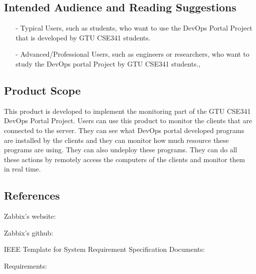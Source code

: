 \documentclass{article}
\newcommand{\MYhref}[3][blue]{\href{#2}{\color{#1}{#3}}}%
\begin{document}
\subsection{ 
	Intended Audience and Reading Suggestions}
\flushleft 
\begin{itemize}
	\item[-] 
	Typical Users, such as students, who want to use the DevOps Portal Project that is developed by GTU CSE341 students.
	\item[-] Advanced/Professional Users, such as engineers or researchers, who want to study the DevOps portal Project by  GTU CSE341 students.,
\end{itemize}

\subsection{Product Scope}
This product is developed to implement the monitoring part of the GTU CSE341 DevOps Portal Project. Users can use this product to monitor the clients that are connected to the server. They can see what DevOps portal developed programs are installed by the clients and they can monitor how much resource these programs are using. They can also undeploy these programs. They can do all these actions by remotely access the computers of the clients and monitor them in real time. 
\newline \newline 


\subsection{References}


Zabbix’s website:  \newline  \MYhref{https://www.zabbix.com}{https://www.zabbix.com} \newline

 Zabbix’s github:  \newline  \MYhref{ https://github.com/zabbix}{ https://github.com/zabbix} \newline

IEEE Template for System Requirement Specification Documents:  \newline  \MYhref{ https://goo.gl/nsUFwy}{https://goo.gl/nsUFwy} \newline

Requirements: \newline \MYhref{https://www.zabbix.com/documentation/3.0/manual/installation/requirements}{https://www.zabbix.com/documentation/3.0/manual/installation/requirements}	
%
%
\end{document}
